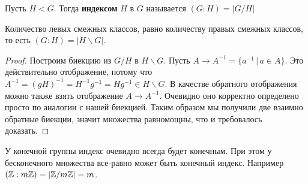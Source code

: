 \documentclass[../main.tex]{subfiles}
\begin{document}
\begin{definition}
    Пусть $H < G$. Тогда \textbf{индексом} $H$ в $G$ называется $(G : H) = |G / H|$
\end{definition}

\begin{theorem-non}
    Количество левых смежных классов, равно количеству правых смежных классов, то есть $(G : H) = |H \backslash G|$.
\end{theorem-non}

\begin{proof}
    Построим биекцию из $G/H$ в $H \backslash G$. Пусть $A \to A^{-1} = \{a^{-1} \, | \, a \in A\}$. Это действительно отображение, потому что $A^{-1} = (gH)^{-1} = H^{-1}g^{-1} = Hg^{-1} \in H \backslash G$. В качестве обратного отображения можно также взять отображение $A \to A^{-1}$. Очевидно оно корректно определено просто по аналогии с нашей биекцией. Таким образом мы получили две взаимно обратные биекции, значит множества равномощны, что и требовалось доказать.
\end{proof}

\begin{remark}
    У конечной группы индекс очевидно всегда будет конечным. При этом у бесконечного множества все-равно может быть конечный индекс. Например $(\mathbb{Z} : m\mathbb{Z}) = |\mathbb{Z}/m\mathbb{Z}| = m$.
\end{remark}
\end{document}
